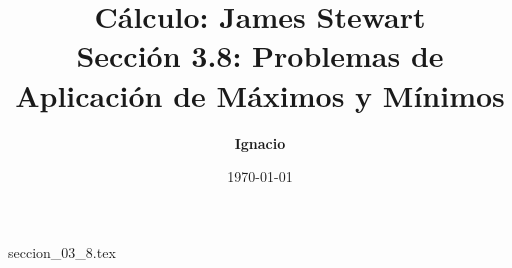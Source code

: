 \documentclass[11pt,spanish,oneside]{report}
\title{\textbf{Cálculo: James Stewart} \\ \Large Sección 3.8: Problemas de Aplicación de Máximos y Mínimos}
\author{\textbf{Ignacio}}
\date{\today}
\begin{document}
\maketitle

{seccion_03_8.tex}
\end{document}
